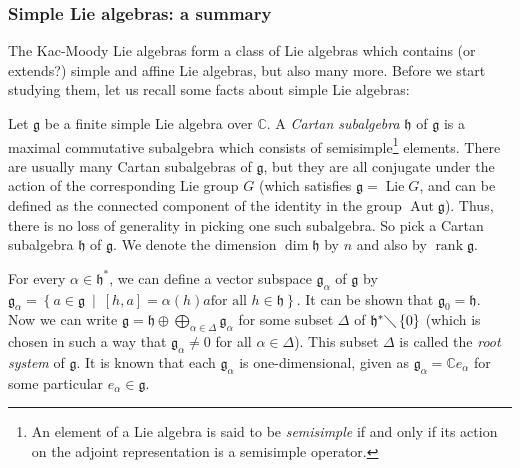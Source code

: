 \documentclass
[numbers=enddot,12pt,final,onecolumn,german,notitlepage]{scrartcl}%
\theoremstyle{definition}
\begin{document}
\subsubsection{Simple Lie algebras: a summary}

The Kac-Moody Lie algebras form a class of Lie algebras which contains (or
extends?) simple and affine Lie algebras, but also many more. Before we start
studying them, let us recall some facts about simple Lie algebras:

Let $\mathfrak{g}$ be a finite simple Lie algebra over $\mathbb{C}$. A
\textit{Cartan subalgebra} $\mathfrak{h}$ of $\mathfrak{g}$ is a maximal
commutative subalgebra which consists of semisimple\footnote{An element of a
Lie algebra is said to be \textit{semisimple} if and only if its action on the
adjoint representation is a semisimple operator.} elements. There are usually
many Cartan subalgebras of $\mathfrak{g}$, but they are all conjugate under
the action of the corresponding Lie group $G$ (which satisfies $\mathfrak{g}%
=\operatorname*{Lie}G$, and can be defined as the connected component of the
identity in the group $\operatorname*{Aut}\mathfrak{g}$). Thus, there is no
loss of generality in picking one such subalgebra. So pick a Cartan subalgebra
$\mathfrak{h}$ of $\mathfrak{g}$. We denote the dimension $\dim\mathfrak{h}$
by $n$ and also by $\operatorname*{rank}\mathfrak{g}$.

For every $\alpha\in\mathfrak{h}^{\ast}$, we can define a vector subspace
$\mathfrak{g}_{\alpha}$ of $\mathfrak{g}$ by $\mathfrak{g}_{\alpha}=\left\{
a\in\mathfrak{g}\ \mid\ \left[  h,a\right]  =\alpha\left(  h\right)  a\text{
for all }h\in\mathfrak{h}\right\}  $. It can be shown that $\mathfrak{g}%
_{0}=\mathfrak{h}$. Now we can write $\mathfrak{g}=\mathfrak{h}\oplus
\bigoplus\limits_{\alpha\in\Delta}\mathfrak{g}_{\alpha}$ for some subset
$\Delta$ of $\mathfrak{h}^{\ast}\diagdown\left\{  0\right\}  $ (which is
chosen in such a way that $\mathfrak{g}_{\alpha}\neq0$ for all $\alpha
\in\Delta$). This subset $\Delta$ is called the \textit{root system} of
$\mathfrak{g}$. It is known that each $\mathfrak{g}_{\alpha}$ is
one-dimensional, given as $\mathfrak{g}_{\alpha}=\mathbb{C}e_{\alpha}$ for
some particular $e_{\alpha}\in\mathfrak{g}$.
\end{document}

